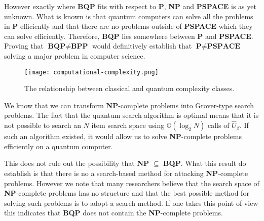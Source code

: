 However exactly where \textbf{BQP} fits with respect to \textbf{P}, \textbf{NP} and \textbf{PSPACE} is as yet unknown. What is known is that quantum computers can solve all the problems in \textbf{P} efficiently and that there are no problems outside of \textbf{PSPACE} which they can solve efficiently. Therefore, \textbf{BQP} lies somewhere between \textbf{P} and \textbf{PSPACE}.
Proving that $\textbf{BQP} \neq \textbf{BPP}$ would definitively establish that $\textbf{P} \neq \textbf{PSPACE}$ solving a major problem in computer science.


\begin{figure}
\texttt{[image: computational-complexity.png]}
\centering
\caption{The relationship between classical and quantum complexity classes.}
\end{figure}
We know that we can transform \textbf{NP}-complete problems into Grover-type search problems.
The fact that the quantum search algorithm is optimal means that it is not possible to search an $N$ item search space using $\mathbb{O}(\log_2{N})$ calls of $\hat{U}_\beta$. If such an algorithm existed, it would allow us to solve \textbf{NP}-complete problems efficiently on a quantum computer.

This does not rule out the possibility that \textbf{NP} $\subseteq$ \textbf{BQP}. What this result do establish is that there is no a search-based method for attacking \textbf{NP}-complete problems.
However we note that many researchers believe that the search space of \textbf{NP}-complete problems has no structure and that the best possible method for solving such problems is to adopt a search method. If one takes this point of view this indicates that \textbf{BQP} does not contain the \textbf{NP}-complete problems.